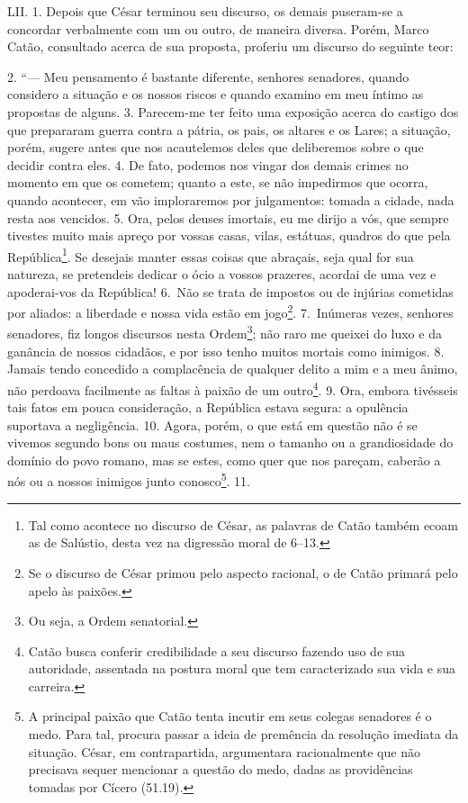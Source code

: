 LII. 1. Depois que César terminou seu discurso, os demais puseram-se a concordar 
verbalmente com um ou outro, de maneira diversa. Porém, Marco Catão, consultado
acerca de sua proposta, proferiu um discurso do seguinte teor: 

2. ``--- Meu pensamento é bastante diferente, senhores senadores, quando considero a
situação e os nossos riscos e quando examino em meu íntimo as propostas de
alguns. 3. Parecem-me ter feito uma exposição acerca do castigo dos que
prepararam guerra contra a pátria, os pais, os altares e os Lares; a situação,
porém, sugere antes que nos acautelemos deles que deliberemos sobre o que
decidir contra eles. 4. De fato, podemos nos vingar dos demais crimes no
momento em que os cometem; quanto a este, se não impedirmos que ocorra, quando
acontecer, em vão imploraremos por julgamentos: tomada a cidade, nada resta aos
vencidos. 5. Ora, pelos deuses imortais, eu me dirijo a vós, que sempre
tivestes muito mais apreço por vossas casas, vilas, estátuas, quadros do que
pela República\footnote{Tal como acontece no discurso de César, as palavras de
Catão também ecoam as de Salústio, desta vez na digressão moral de 6--13.}. Se
desejais manter essas coisas que abraçais, seja qual for sua natureza, se
pretendeis dedicar o ócio a vossos prazeres, acordai de uma vez e apoderai-vos
da República! 6.~Não se trata de impostos ou de injúrias cometidas por aliados:
a liberdade e nossa vida estão em jogo\footnote{Se o discurso de César primou
pelo aspecto racional, o de Catão primará pelo apelo às paixões.}. 7.~Inúmeras
vezes, senhores senadores, fiz longos discursos nesta Ordem\footnote{Ou seja, a Ordem senatorial.}; não raro me
queixei do luxo e da ganância de nossos cidadãos, e por isso tenho muitos
mortais como inimigos. 8. Jamais tendo concedido a complacência de qualquer
delito a mim e a meu ânimo, não perdoava facilmente as faltas à paixão de um
outro\footnote{Catão busca conferir credibilidade a seu discurso fazendo uso de
sua autoridade, assentada na postura moral que tem caracterizado sua vida e sua
carreira.}. 9. Ora, embora tivésseis tais fatos em pouca consideração, a
República estava segura: a opulência suportava a negligência. 10. Agora, porém,
o que está em questão não é se vivemos segundo bons ou maus costumes, nem o tamanho
ou a grandiosidade do domínio do povo romano, mas se estes, como quer que nos
pareçam, caberão a nós ou a nossos inimigos junto conosco\footnote{A principal
paixão que Catão tenta incutir em seus colegas senadores é o medo. Para tal,
procura passar a ideia de premência da resolução imediata da situação. César,
em contrapartida, argumentara racionalmente que não precisava sequer mencionar
a questão do medo, dadas as providências tomadas por Cícero (51.19).}. 11.
